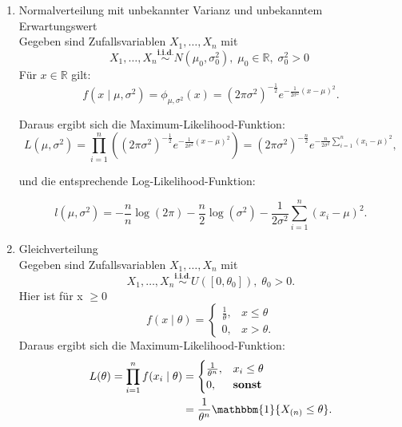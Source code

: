 \documentclass[10pt]{article}
\newcommand{\FZV}{X_1, \ldots, X_n} %
\newcommand{\IR}{\mathbb{R}} %
\newcommand{\xt}{x \mid \theta} %
\begin{document}
\begin{enumerate}[label = (\roman*)]
		
		\item Normalverteilung mit unbekannter Varianz und unbekanntem Erwartungswert\\
		Gegeben sind Zufallsvariablen $\FZV$ mit
		\begin{equation*}
			\FZV \overset{\textbf{i.i.d.}} {\sim} N(\mu_0,\sigma_0^2),\; \mu_0 \in \IR, \; \sigma_0^2 >0 \; 
		\end{equation*} 
		Für $x \in \IR$	gilt:
		\begin{equation*}
			f(x \mid \mu, \sigma^2) = \phi_{\mu,\sigma^2}(x)=(2\pi\sigma^2)^{-\frac{1}{2}}e^{-\frac{1}{2\sigma^2}(x-\mu)^2}.
		\end{equation*}
		
		Daraus ergibt sich die Maximum-Likelihood-Funktion:
		\begin{equation*}
			L(\mu, \sigma^2) = \prod_{i=1}^{n}((2\pi\sigma^2)^{-\frac{1}{2}}e^{-\frac{1}{2\sigma^2}(x-\mu)^2}) = (2\pi\sigma^2)^{-\frac{n}{2}}e^{-\frac{n}{2\sigma^2}\sum_{i=1}^{n}(x_i-\mu)^2},
		\end{equation*}
		
		und die entsprechende Log-Likelihood-Funktion:
		
		\begin{equation*}
			l(\mu, \sigma^2) = -\frac{n}{n}\log(2\pi) - \frac{n}{2}\log(\sigma^2)-\frac{1}{2\sigma^2}\sum_{i=1}^{n}(x_i-\mu)^2.
		\end{equation*}
		
		\item Gleichverteilung\\
		Gegeben sind Zufallsvariablen $\FZV$ mit
		\begin{equation*}
			\FZV \overset{\textbf{i.i.d.}}{\sim} U([0,\theta_0]), \; \theta_0 >0.
		\end{equation*}
		Hier ist für x $\geq 0$
		\begin{equation*}
			f(\xt)=\begin{cases}
				\frac{1}{\theta}, & x\leq \theta\\
				0, & x >\theta.
			\end{cases}
		\end{equation*}
		Daraus ergibt sich die Maximum-Likelihood-Funktion:
		\begin{equation*}
			\begin{split}
					L(\theta)=\prod_{i=1}^{n} f(x_i \mid \theta) &= \begin{cases}
					\frac{1}{\theta^n}, & x_i\leq \theta\\
					0, & \textbf{sonst}
				\end{cases}\\ &= \frac{1}{\theta^n} \mathbbm{1}\{X_{(n)} \leq \theta\}.
			\end{split}
		\end{equation*}
		
	\end{enumerate}
	
\end{document}
